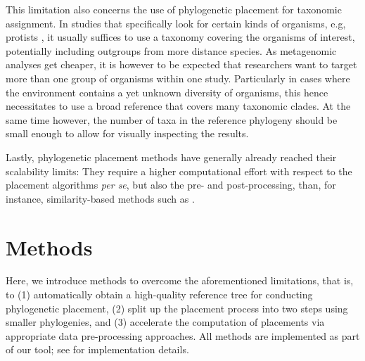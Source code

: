 This limitation also concerns the use of phylogenetic placement for taxonomic assignment.
In studies that specifically look for certain kinds of organisms, e.g, protists \citep{Mahe2017},
it usually suffices to use a taxonomy covering the organisms of interest,
potentially including outgroups from more distance species.
As metagenomic analyses get cheaper,
it is however to be expected that researchers want to target more than one group of organisms within one study.
Particularly in cases where the environment contains a yet unknown diversity of organisms,
this hence necessitates to use a broad reference that covers many taxonomic clades.
At the same time however, the number of taxa in the reference phylogeny
should be small enough to allow for visually inspecting the results.

Lastly, phylogenetic placement methods have generally already reached their scalability limits:
They require a higher computational effort with respect to the placement algorithms \emph{per se},
but also the pre- and post-processing, than, for instance, similarity-based methods such as .



\section{Methods}
\label{ch:AutomaticTrees:sec:Methods}


Here, we introduce methods to overcome the aforementioned limitations, that is, to
(1) automatically obtain a high-quality reference tree for conducting phylogenetic placement,
(2) split up the placement process into two steps using smaller phylogenies,
and (3) accelerate the computation of placements via appropriate data pre-processing approaches.
All methods are implemented as part of our  tool;
see  for implementation details.

